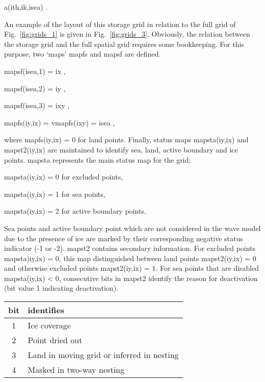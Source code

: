 \vspace{\baselineskip}
\centerline{\F a(ith,ik,isea) .}
\vspace{\baselineskip}

\noindent
An example of the layout of this storage grid in relation to the full grid of
Fig.~\ref{fig:grids_1} is given in Fig.~\ref{fig:grids_3}. Obviously, the
relation between the storage grid and the full spatial grid requires some
bookkeeping. For this purpose, two `maps' {\F mapfs} and {\F mapsf} are
defined.

\vspace{\baselineskip}
\centerline{\F mapsf(isea,1) = ix ,}
\centerline{\F mapsf(isea,2) = iy ,}
\centerline{\F mapsf(isea,3) = ixy ,}
\centerline{\F mapfs(iy,ix) = vmapfs(ixy) = isea ,}
\vspace{\baselineskip}



\noindent
where {\F mapfs(iy,ix) = 0} for land points. Finally, status maps {\F
mapsta(iy,ix)} and {\F mapst2(iy,ix)} are maintained to identify sea, land,
active boundary and ice points. {\F mapsta} represents the main status
map for the grid;

\vspace{\baselineskip} \noindent
\strut \hspace{25mm} {\F mapsta(iy,ix) = 0} \hspace{10mm} for excluded points, \\
\strut \hspace{25mm} {\F mapsta(iy,ix) = 1} \hspace{10mm} for sea points, \\
\strut \hspace{25mm} {\F mapsta(iy,ix) = 2} \hspace{10mm} for active boundary points.

\vspace{\baselineskip} 
\noindent 
Sea points and active boundary point which are not considered in the wave
model due to the presence of ice are marked by their corresponding negative
status indicator (-1 or -2). {\F mapst2} contains secondary information. For
excluded points {\F mapsta)iy,ix) = 0}, this map distinguished between land
points {\F mapst2(iy,ix) = 0} and otherwise excluded points {\F mapst2(iy,ix)
= 1}. For sea points that are disabled {\F mapsta(iy,ix) < 0}, consecutive
bits in {\F mapst2} identify the reason for deactivation (bit value 1
indicating deactivation).

\begin{center} \begin{tabular}{cl}
 bit & identifies \\ \hline
  1  & Ice coverage     \\
  2  & Point dried out  \\
  3  & Land in moving grid or inferred in nesting \\
  4  & Masked in two-way nesting
\end{tabular} \end{center}

